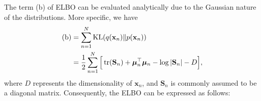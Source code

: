 The term (b) of \MakeUppercase{elbo} can be evaluated analytically due to the Gaussian nature of the distributions. More specific, we have 
\begin{subequations} \label{eq:evaluation_term_2}
\begin{align}
   \text{(b)} & =  \sum_{n=1}^N\operatorname{KL}(q({\mathbf x}_n) \| p({\mathbf x}_n)) \\
    & =  \frac{1}{2} \sum_{n=1}^{N} \Big[ \operatorname{tr}(\mathbf{S}_{n}) + \boldsymbol{\mu}_n^{\top} \boldsymbol{\mu}_n -\log |\mathbf{S}_{n}| - D  \Big],
\end{align}
\end{subequations}
where \(D\) represents the dimensionality of \(\mathbf{x}_n\), and \(\mathbf{S}_n\) is commonly assumed to be a diagonal matrix. Consequently, the \MakeUppercase{elbo} can be expressed as follows:

